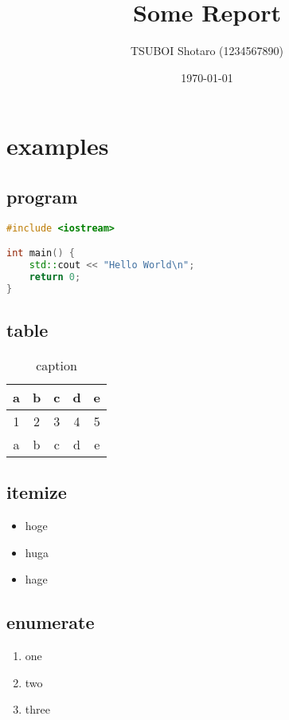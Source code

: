 \documentclass[11pt,a4paper]{ltjsarticle}
\title{Some Report}
\author{TSUBOI Shotaro (1234567890)}
\date{\today}
\begin{document}
\maketitle

\section{examples}

\subsection*{program}

\begin{lstlisting}[caption={Hello, world},label={Hello, world},language={c++}]
#include <iostream>

int main() {
    std::cout << "Hello World\n";
    return 0;
}
\end{lstlisting}

\subsection*{table}

\begin{table}[H]
    \centering
    \caption{caption}
    \begin{tabular}{|c|c|c|c|c|}
        \hline
        a & b & c & d & e \\ \hline
        1 & 2 & 3 & 4 & 5 \\ \hline
        a & b & c & d & e \\ \hline
    \end{tabular}
\end{table}

\subsection*{itemize}

\begin{itemize}
    \item hoge
    \item huga
    \item hage
\end{itemize}

\subsection*{enumerate}

\begin{enumerate}
    \item one
    \item two
    \item three
\end{enumerate}
\end{document}
